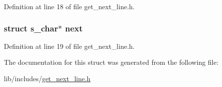 Definition at line 18 of file get\-\_\-next\-\_\-line.\-h.

\hypertarget{structs__char_a948ac1df44de106ac471ed05df56482c}{
\subsubsection[{next}]{\setlength{\rightskip}{0pt plus 5cm}struct {\bf s\-\_\-char}$\ast$ next}}\label{structs__char_a948ac1df44de106ac471ed05df56482c}


Definition at line 19 of file get\-\_\-next\-\_\-line.\-h.



The documentation for this struct was generated from the following file\-:\begin{DoxyCompactItemize}
\item 
lib/includes/\hyperlink{get__next__line_8h}{get\-\_\-next\-\_\-line.\-h}\end{DoxyCompactItemize}
